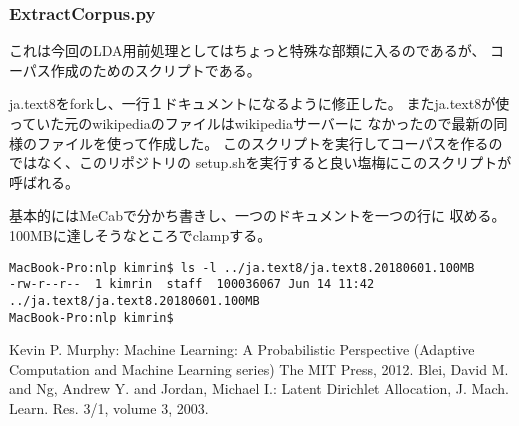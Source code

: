 \documentclass[uplatex]{jsarticle}
\begin{document}
\subsubsection{ExtractCorpus.py}
これは今回のLDA用前処理としてはちょっと特殊な部類に入るのであるが、
コーパス作成のためのスクリプトである。

ja.text8をforkし、一行１ドキュメントになるように修正した。
またja.text8が使っていた元のwikipediaのファイルはwikipediaサーバーに
なかったので最新の同様のファイルを使って作成した。
このスクリプトを実行してコーパスを作るのではなく、このリポジトリの
setup.shを実行すると良い塩梅にこのスクリプトが呼ばれる。

基本的にはMeCabで分かち書きし、一つのドキュメントを一つの行に
収める。100MBに達しそうなところでclampする。

\begin{lstlisting}
MacBook-Pro:nlp kimrin$ ls -l ../ja.text8/ja.text8.20180601.100MB
-rw-r--r--  1 kimrin  staff  100036067 Jun 14 11:42 ../ja.text8/ja.text8.20180601.100MB
MacBook-Pro:nlp kimrin$
\end{lstlisting}


\begin{thebibliography}{99}
   Kevin P. Murphy: Machine Learning: A Probabilistic Perspective (Adaptive Computation and Machine Learning series) The MIT Press, 2012.
   Blei, David M. and Ng, Andrew Y. and Jordan, Michael I.: Latent Dirichlet Allocation,
J. Mach. Learn. Res. 3/1, volume 3, 2003.
\end{thebibliography}
\end{document}
